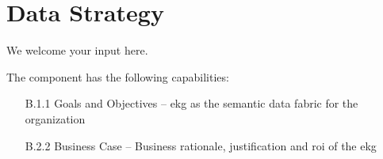 \chapter{Data Strategy}\label{ch:ekgmm-b-1} %

We welcome your input here.

The  component has the following capabilities:

\begin{itemize}[leftmargin=.5in]
    \item[B.1.1] Goals and Objectives -- \gls{ekg} as the semantic data fabric for the organization
    \item[B.2.2] Business Case -- Business rationale, justification and \gls{roi} of the \gls{ekg}
\end{itemize}

